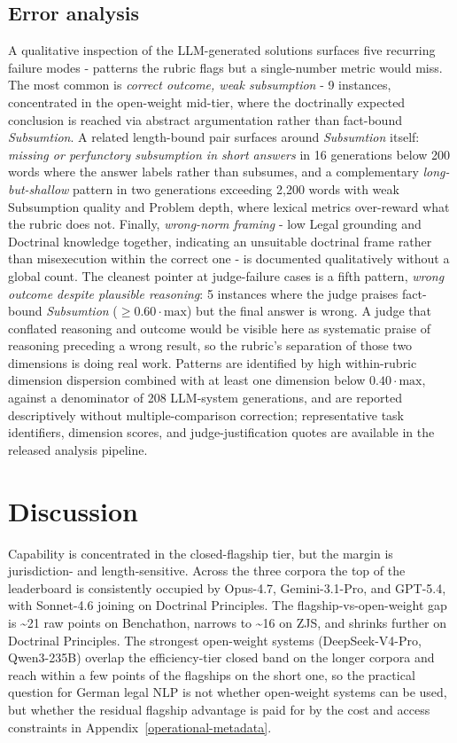 \documentclass[11pt]{article}
\begin{document}
\subsection{Error analysis}\label{error-analysis}

A qualitative inspection of the LLM-generated solutions surfaces five
recurring failure modes - patterns the rubric flags but a single-number
metric would miss. The most common is \emph{correct outcome, weak
subsumption} - 9 instances, concentrated in the open-weight mid-tier,
where the doctrinally expected conclusion is reached via abstract
argumentation rather than fact-bound \emph{Subsumtion}. A related
length-bound pair surfaces around \emph{Subsumtion} itself:
\emph{missing or perfunctory subsumption in short answers} in 16
generations below 200 words where the answer labels rather than
subsumes, and a complementary \emph{long-but-shallow} pattern in two
generations exceeding 2,200 words with weak Subsumption quality and
Problem depth, where lexical metrics over-reward what the rubric does
not. Finally, \emph{wrong-norm framing} - low Legal grounding and
Doctrinal knowledge together, indicating an unsuitable doctrinal frame
rather than misexecution within the correct one - is documented
qualitatively without a global count. The cleanest pointer at
judge-failure cases is a fifth pattern, \emph{wrong outcome despite
plausible reasoning}: 5 instances where the judge praises fact-bound
\emph{Subsumtion} (\(\geq 0.60\cdot\text{max}\)) but the final answer is
wrong. A judge that conflated reasoning and outcome would be visible
here as systematic praise of reasoning preceding a wrong result, so the
rubric's separation of those two dimensions is doing real work. Patterns
are identified by high within-rubric dimension dispersion combined with
at least one dimension below \(0.40\cdot\text{max}\), against a
denominator of 208 LLM-system generations, and are reported
descriptively without multiple-comparison correction; representative
task identifiers, dimension scores, and judge-justification quotes are
available in the released analysis pipeline.

\section{Discussion}\label{discussion}

Capability is concentrated in the closed-flagship tier, but the margin
is jurisdiction- and length-sensitive. Across the three corpora the top
of the leaderboard is consistently occupied by Opus-4.7, Gemini-3.1-Pro,
and GPT-5.4, with Sonnet-4.6 joining on Doctrinal Principles. The
flagship-vs-open-weight gap is \textasciitilde21 raw points on
Benchathon, narrows to \textasciitilde16 on ZJS, and shrinks further on
Doctrinal Principles. The strongest open-weight systems
(DeepSeek-V4-Pro, Qwen3-235B) overlap the efficiency-tier closed band on
the longer corpora and reach within a few points of the flagships on the
short one, so the practical question for German legal NLP is not whether
open-weight systems can be used, but whether the residual flagship
advantage is paid for by the cost and access constraints in
Appendix~\ref{operational-metadata}.
\end{document}
